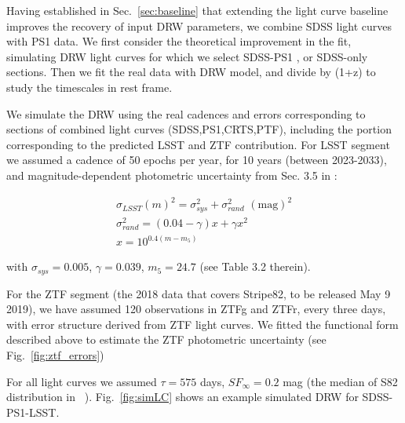 \documentclass[twocolumn]{aastex62}
\begin{document}
Having established in Sec.~\ref{sec:baseline} that extending the light curve baseline improves the recovery of input DRW parameters,  we combine SDSS light curves with PS1 data. We first consider the theoretical improvement in the fit, simulating DRW light curves for which we select SDSS-PS1 , or SDSS-only sections.  Then we fit the real data with DRW model, and divide by (1+z) to study the timescales in rest frame. 


We simulate the DRW using the real cadences and errors corresponding to sections of combined light curves (SDSS,PS1,CRTS,PTF), including the portion corresponding to the predicted LSST and ZTF contribution.  For LSST segment we assumed a cadence of 50 epochs per year,  for 10 years (between 2023-2033), and  magnitude-dependent photometric uncertainty from Sec. 3.5 in \citet{lsstscibook}:

\begin{eqnarray}
\sigma_{LSST}(m)^{2} = \sigma_{sys}^{2} + \sigma_{rand}^{2} \,\, \mathrm{(mag)}^{2}\\
\sigma_{rand}^{2} = (0.04-\gamma)x + \gamma x^{2} \\
x = 10^{0.4(m-m_{5})}
\end{eqnarray}

with  $\sigma_{sys} = 0.005$, $\gamma=0.039$, $m_{5} = 24.7$ (see Table 3.2  therein).


For the ZTF segment (the 2018 data that covers Stripe82, to be released May 9 2019), we have assumed 120 observations in ZTFg and ZTFr, every three days, with error structure derived from ZTF light curves. We fitted the functional form described above to estimate the ZTF photometric uncertainty (see Fig.~\ref{fig:ztf_errors})



\begin{figure*}%
\caption{The rms spread as a function of magnitude for ZTF objects with over 100 observations. We overplot the functional describing the adopted error model. Properties of ZTF photometric uncertainty are largely similar to the PTF uncertainties.}
\label{fig:ztf_errors}
\end{figure*} 


For all light curves we assumed  $\tau = 575 $ days, $SF_{\infty} = 0.2$ mag (the median of S82 distribution in ~\citet{macleod2010}). Fig.~\ref{fig:simLC} shows an example simulated DRW for SDSS-PS1-LSST.

\begin{figure*}%
\caption{Simulated DRW process sampled at real cadence of SDSS, PS1, and simulated cadence of LSST. To each observed  point we add Gaussian noise corresponding to the reported  heteroscedastic (different for all points) errors for SDSS-PS1, and simulated magnitude-dependent errors for LSST. }
\label{fig:simLC}
\end{figure*} 
\end{document}
